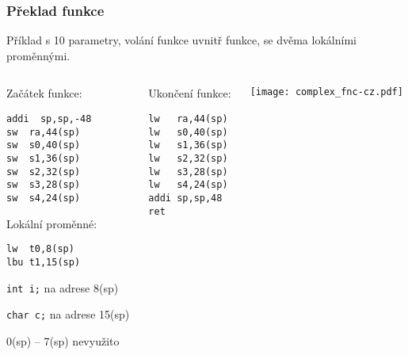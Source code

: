 \documentclass{beamer}
\begin{document}
\begin{frame}[fragile,shrink=5]
\frametitle{Překlad funkce}

Příklad s 10 parametry, volání funkce uvnitř funkce, se dvěma lokálními proměnnými.

\begin{columns}
\begin{column}{0.35\textwidth}
Začátek funkce:

\begin{verbatim}
addi  sp,sp,-48
sw  ra,44(sp)
sw  s0,40(sp)
sw  s1,36(sp)
sw  s2,32(sp)
sw  s3,28(sp)
sw  s4,24(sp)
\end{verbatim}

Lokální proměnné:
\begin{verbatim}
lw  t0,8(sp)
lbu t1,15(sp)
\end{verbatim}

\texttt{int i;} na adrese 8(sp)

\texttt{char c;} na adrese 15(sp)

0(sp) -- 7(sp) nevyužito


\end{column}   
\begin{column}{0.29\textwidth}
Ukončení funkce:

\begin{verbatim}
lw   ra,44(sp)
lw   s0,40(sp)
lw   s1,36(sp)
lw   s2,32(sp)
lw   s3,28(sp)
lw   s4,24(sp)
addi sp,sp,48
ret
\end{verbatim}

\end{column}
\begin{column}{0.35\textwidth}  
\texttt{[image: complex\_fnc-cz.pdf]}
\end{column}
\end{columns}
\end{frame}
\end{document}
